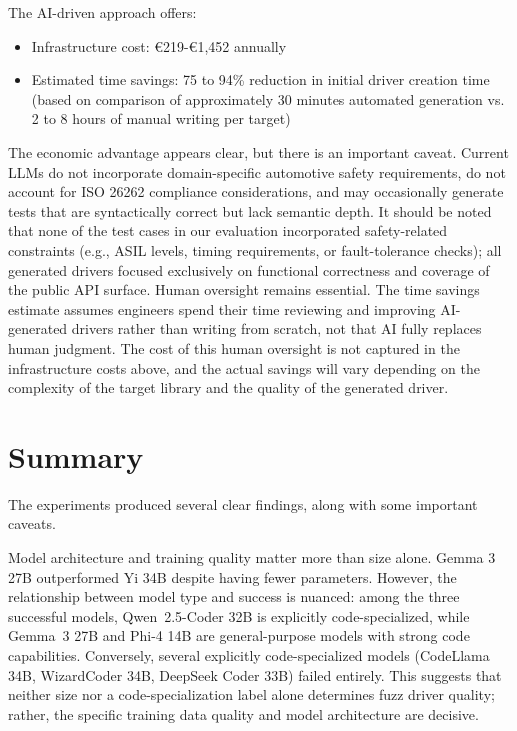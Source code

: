 The AI-driven approach offers:
\begin{itemize}
    \item Infrastructure cost: \euro{}219-\euro{}1,452 annually
    \item Estimated time savings: 75 to 94\% reduction in initial driver creation time (based on comparison of approximately 30 minutes automated generation vs. 2 to 8 hours of manual writing per target)
\end{itemize}

The economic advantage appears clear, but there is an important caveat. Current LLMs do not incorporate domain-specific automotive safety requirements, do not account for ISO 26262 compliance considerations, and may occasionally generate tests that are syntactically correct but lack semantic depth. It should be noted that none of the test cases in our evaluation incorporated safety-related constraints (e.g., ASIL levels, timing requirements, or fault-tolerance checks); all generated drivers focused exclusively on functional correctness and coverage of the public API surface. Human oversight remains essential. The time savings estimate assumes engineers spend their time reviewing and improving AI-generated drivers rather than writing from scratch, not that AI fully replaces human judgment. The cost of this human oversight is not captured in the infrastructure costs above, and the actual savings will vary depending on the complexity of the target library and the quality of the generated driver.


\section{Summary}
\label{sec:results_summary}

The experiments produced several clear findings, along with some important caveats.

Model architecture and training quality matter more than size alone. Gemma 3 27B outperformed Yi 34B despite having fewer parameters. However, the relationship between model type and success is nuanced: among the three successful models, Qwen~2.5-Coder 32B is explicitly code-specialized, while Gemma~3 27B and Phi-4 14B are general-purpose models with strong code capabilities. Conversely, several explicitly code-specialized models (CodeLlama 34B, WizardCoder 34B, DeepSeek Coder 33B) failed entirely. This suggests that neither size nor a code-specialization label alone determines fuzz driver quality; rather, the specific training data quality and model architecture are decisive.

